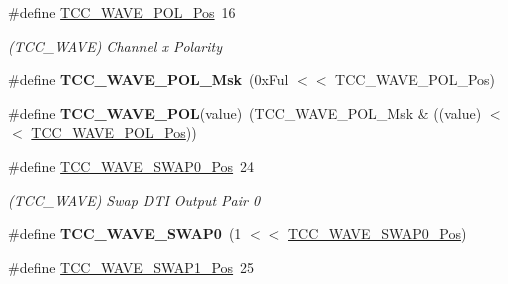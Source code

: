 \begin{DoxyCompactItemize}
\item 
\hypertarget{group___s_a_m_l21___t_c_c_ga979360b88f6fac1f82d14aaa8f9af256}{}\#define \hyperlink{group___s_a_m_l21___t_c_c_ga979360b88f6fac1f82d14aaa8f9af256}{T\+C\+C\+\_\+\+W\+A\+V\+E\+\_\+\+P\+O\+L\+\_\+\+Pos}~16\label{group___s_a_m_l21___t_c_c_ga979360b88f6fac1f82d14aaa8f9af256}

\begin{DoxyCompactList}\small\item\em (T\+C\+C\+\_\+\+W\+A\+V\+E) Channel x Polarity \end{DoxyCompactList}\item 
\hypertarget{group___s_a_m_l21___t_c_c_gad88a80bc90cc1de7b5dc5f7d2809ca97}{}\#define {\bfseries T\+C\+C\+\_\+\+W\+A\+V\+E\+\_\+\+P\+O\+L\+\_\+\+Msk}~(0x\+Ful $<$$<$ T\+C\+C\+\_\+\+W\+A\+V\+E\+\_\+\+P\+O\+L\+\_\+\+Pos)\label{group___s_a_m_l21___t_c_c_gad88a80bc90cc1de7b5dc5f7d2809ca97}

\item 
\hypertarget{group___s_a_m_l21___t_c_c_ga8dd7c1b7facc6162bbeb3697c33c296f}{}\#define {\bfseries T\+C\+C\+\_\+\+W\+A\+V\+E\+\_\+\+P\+O\+L}(value)~(T\+C\+C\+\_\+\+W\+A\+V\+E\+\_\+\+P\+O\+L\+\_\+\+Msk \& ((value) $<$$<$ \hyperlink{group___s_a_m_l21___t_c_c_ga979360b88f6fac1f82d14aaa8f9af256}{T\+C\+C\+\_\+\+W\+A\+V\+E\+\_\+\+P\+O\+L\+\_\+\+Pos}))\label{group___s_a_m_l21___t_c_c_ga8dd7c1b7facc6162bbeb3697c33c296f}

\item 
\hypertarget{group___s_a_m_l21___t_c_c_gaa29047de3adb31b3f4c61fabd94c7358}{}\#define \hyperlink{group___s_a_m_l21___t_c_c_gaa29047de3adb31b3f4c61fabd94c7358}{T\+C\+C\+\_\+\+W\+A\+V\+E\+\_\+\+S\+W\+A\+P0\+\_\+\+Pos}~24\label{group___s_a_m_l21___t_c_c_gaa29047de3adb31b3f4c61fabd94c7358}

\begin{DoxyCompactList}\small\item\em (T\+C\+C\+\_\+\+W\+A\+V\+E) Swap D\+T\+I Output Pair 0 \end{DoxyCompactList}\item 
\hypertarget{group___s_a_m_l21___t_c_c_gaa7ce0f347d0b6456ea88830c1fdb8af5}{}\#define {\bfseries T\+C\+C\+\_\+\+W\+A\+V\+E\+\_\+\+S\+W\+A\+P0}~(1 $<$$<$ \hyperlink{group___s_a_m_l21___t_c_c_gaa29047de3adb31b3f4c61fabd94c7358}{T\+C\+C\+\_\+\+W\+A\+V\+E\+\_\+\+S\+W\+A\+P0\+\_\+\+Pos})\label{group___s_a_m_l21___t_c_c_gaa7ce0f347d0b6456ea88830c1fdb8af5}

\item 
\hypertarget{group___s_a_m_l21___t_c_c_ga52680b439e3fd1847338fc5044f4f38f}{}\#define \hyperlink{group___s_a_m_l21___t_c_c_ga52680b439e3fd1847338fc5044f4f38f}{T\+C\+C\+\_\+\+W\+A\+V\+E\+\_\+\+S\+W\+A\+P1\+\_\+\+Pos}~25\label{group___s_a_m_l21___t_c_c_ga52680b439e3fd1847338fc5044f4f38f}


\end{DoxyCompactItemize}
